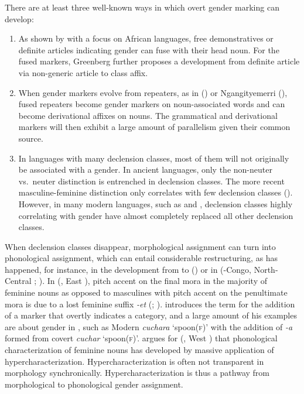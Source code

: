 \documentclass[output=collectionpaper]{langsci/langscibook}
\begin{document}
There are at least three well-known ways in which overt gender marking can develop:

\begin{enumerate}[label=(\roman*)]
\item As shown by \cite{Greenberg1978} with a focus on African languages, free demonstratives or definite articles indicating gender can fuse with their head noun. For the fused markers, Greenberg further proposes a development from definite article via non-generic article to class affix.
\item When gender markers evolve from repeaters, as in  (\citealt[278--279]{Grinevald2004}) or Ngan\textquotesingle{}gityemerri (\citealt{Reid1997}), fused repeaters become gender markers on noun-associated words and can become derivational affixes on nouns. The grammatical and derivational markers will then exhibit a large amount of parallelism given their common source.
\item In languages with many declension classes, most of them will not originally be associated with a gender. In ancient  languages, only the non-neuter vs.\ neuter distinction is entrenched in declension classes. The more recent masculine-feminine distinction only correlates with few declension classes (\citealt[116--117]{Delbruck1883}). However, in many modern  languages, such as  and , declension classes highly correlating with gender have almost completely replaced all other declension classes.
\end{enumerate}

When declension classes disappear, morphological assignment can turn into phonological assignment, which can entail considerable restructuring, as has happened, for instance, in the development from  to  (\citealt{Polinsky2003}) or in  (-Congo, North-Central ; \citealt[46]{Becher2001}). In  (, East ), pitch accent on the final mora in the majority of feminine nouns as opposed to masculines with pitch accent on the penultimate mora is due to a lost feminine suffix \textit{-et} (\citealt[46]{Oomen1981}; \citealt[102]{Corbett1991}). \cite{Malkiel1957-1958} introduces the term  for the addition of a marker that overtly indicates a category, and a large amount of his examples are about gender in , such as Modern  \textit{cuchara} `spoon(\textsc{f})' with the addition of \textit{-a} formed from covert  \textit{cuchar} `spoon(\textsc{f})'. \cite[202]{Newman1979} argues for  (, West ) that phonological characterization of feminine nouns has developed by massive application of hypercharacterization. Hypercharacterization is often not transparent in morphology synchronically. Hypercharacterization is thus a pathway from morphological to phonological gender assignment.
\end{document}
